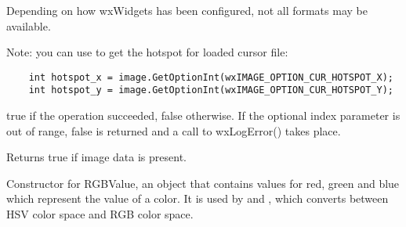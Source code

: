 
Depending on how wxWidgets has been configured, not all formats may be available.

Note: you can use  to get the
hotspot for loaded cursor file:
\begin{verbatim}
    int hotspot_x = image.GetOptionInt(wxIMAGE_OPTION_CUR_HOTSPOT_X);
    int hotspot_y = image.GetOptionInt(wxIMAGE_OPTION_CUR_HOTSPOT_Y);

\end{verbatim}


true if the operation succeeded, false otherwise. If the optional index parameter is out of range,
false is returned and a call to wxLogError() takes place.







\label{wximageisok}


Returns true if image data is present.


\label{rgbvaluergbvalue}


Constructor for RGBValue, an object that contains values for red, green and blue which
represent the value of a color. It is used by 
and , which
converts between HSV color space and RGB color space.

